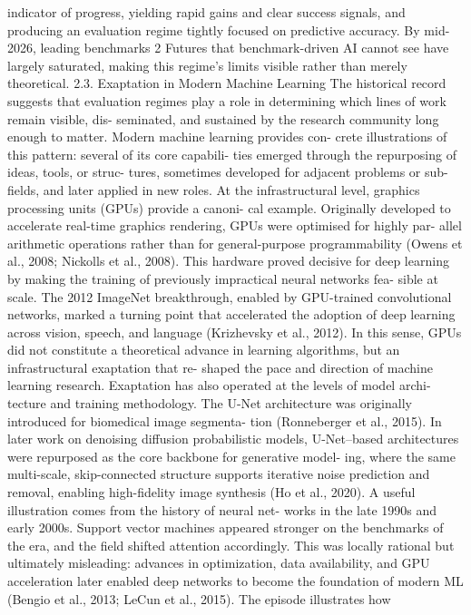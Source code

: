 indicator of progress, yielding rapid gains and clear success
signals, and producing an evaluation regime tightly focused
on predictive accuracy. By mid-2026, leading benchmarks
2
Futures that benchmark-driven AI cannot see
have largely saturated, making this regime’s limits visible
rather than merely theoretical.
2.3. Exaptation in Modern Machine Learning
The historical record suggests that evaluation regimes play a
role in determining which lines of work remain visible, dis-
seminated, and sustained by the research community long
enough to matter. Modern machine learning provides con-
crete illustrations of this pattern: several of its core capabili-
ties emerged through the repurposing of ideas, tools, or struc-
tures, sometimes developed for adjacent problems or sub-
fields, and later applied in new roles. At the infrastructural
level, graphics processing units (GPUs) provide a canoni-
cal example. Originally developed to accelerate real-time
graphics rendering, GPUs were optimised for highly par-
allel arithmetic operations rather than for general-purpose
programmability (Owens et al., 2008; Nickolls et al., 2008).
This hardware proved decisive for deep learning by making
the training of previously impractical neural networks fea-
sible at scale. The 2012 ImageNet breakthrough, enabled
by GPU-trained convolutional networks, marked a turning
point that accelerated the adoption of deep learning across
vision, speech, and language (Krizhevsky et al., 2012). In
this sense, GPUs did not constitute a theoretical advance in
learning algorithms, but an infrastructural exaptation that re-
shaped the pace and direction of machine learning research.
Exaptation has also operated at the levels of model archi-
tecture and training methodology. The U-Net architecture
was originally introduced for biomedical image segmenta-
tion (Ronneberger et al., 2015). In later work on denoising
diffusion probabilistic models, U-Net–based architectures
were repurposed as the core backbone for generative model-
ing, where the same multi-scale, skip-connected structure
supports iterative noise prediction and removal, enabling
high-fidelity image synthesis (Ho et al., 2020).
A useful illustration comes from the history of neural net-
works in the late 1990s and early 2000s. Support vector
machines appeared stronger on the benchmarks of the era,
and the field shifted attention accordingly. This was locally
rational but ultimately misleading: advances in optimization,
data availability, and GPU acceleration later enabled deep
networks to become the foundation of modern ML (Bengio
et al., 2013; LeCun et al., 2015). The episode illustrates how
